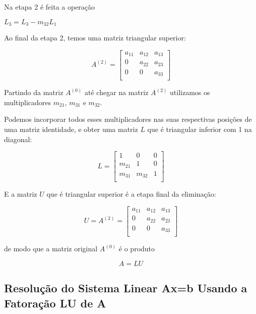 \documentclass[a4paper]{article}
\begin{document}
Na etapa 2 é feita a operação

$L_3 = L_3 - m_{32}L_1$

Ao final da etapa 2, temos uma matriz triangular superior:

\begin{displaymath}
  A^{(2)} = \begin{bmatrix}
    a_{11} & a_{12} & a_{13} \\
    0 & a_{22} & a_{23} \\
    0 & 0 & a_{33} \\
  \end{bmatrix}
\end{displaymath}

Partindo da matriz $A^{(0)}$ até chegar na matriz $A^{(2)}$ utilizamos
os multiplicadores $m_{21}$, $m_{31}$ e $m_{32}$.

Podemos incorporar todos esses multiplicadores nas suas respectivas
posições de uma matriz identidade, e obter uma matriz $L$ que é
triangular inferior com 1 na diagonal:

\begin{displaymath}
  L = \begin{bmatrix}
    1 & 0 & 0 \\
    m_{21} & 1 & 0 \\
    m_{31} & m_{32} & 1 \\
  \end{bmatrix}
\end{displaymath}

E a matriz $U$ que é triangular superior é a etapa final da eliminação:

\begin{displaymath}
  U = A^{(2)} = \begin{bmatrix}
    a_{11} & a_{12} & a_{13} \\
    0 & a_{22} & a_{23} \\
    0 & 0 & a_{33} \\
  \end{bmatrix}
\end{displaymath}

de modo que a matriz original $A^{(0)}$ é o produto

\begin{displaymath}
  A = LU
\end{displaymath}

\subsection*{Resolução do Sistema Linear Ax=b Usando a Fatoração LU de
A}
\end{document}
